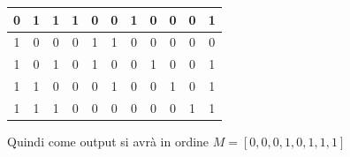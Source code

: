 \documentclass[a4paper,12pt, oneside]{book}
\begin{document}
\begin{esercizio}
\begin{center}
\begin{tabular}{|c|c|c|c|c|c|c|c|c|c|c|}
      \hline
      0   & 1   & 1   & 1              & 0              & 0              & 1                              & 0                              & 0                             & 0                   & 1            \\
      \hline
      1   & 0   & 0   & 0              & 1              & 1              & 0                              & 0                              & 0                             & 0                   & 0            \\
      \hline
      1   & 0   & 1   & 0              & 1              & 0              & 0                              & 1                              & 0                             & 0                   & 1            \\
      \hline
      1   & 1   & 0   & 0              & 0              & 1              & 0                              & 0                              & 1                             & 0                   & 1            \\
      \hline
      1   & 1   & 1   & 0              & 0              & 0              & 0                              & 0                              & 0                             & 1                   & 1            \\
      \hline
    \end{tabular}
  \end{center}
  Quindi come output si avrà in ordine $M=[0,0,0,1,0,1,1,1]$
\end{esercizio}
\newpage
\end{document}

